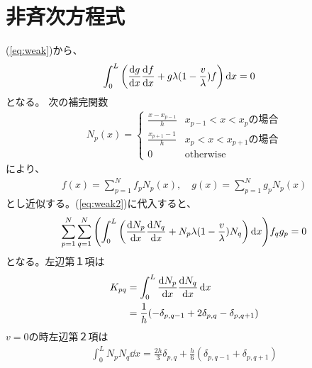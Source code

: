 \documentclass[xelatex,ja=standard]{bxjsarticle}
\begin{document}
\section{非斉次方程式}
(\ref{eq:weak})から、
\begin{align}
    \int_0^L\qty(\dv{g}{x}\dv{f}{x} + g\lambda(1 - \frac{v}{\lambda})f)\dd{x}
     &= 0 \label{eq:weak2}
\end{align}
となる。
次の補完関数
\begin{align}
    N_p(x) = 
    \begin{cases}
        \frac{x-x_{p-1}}{h}&x_{p-1}<x<x_pの場合\\
        \frac{x_{p+1} - 1}{h}&x_{p}<x<x_{p+1}の場合\\
        0&\text{otherwise}
    \end{cases}
\end{align}
により、
\begin{align}
    f(x) = \sum_{p=1}^N f_pN_p(x),\quad g(x) = \sum_{p=1}^N g_pN_p(x)
\end{align}
とし近似する。(\ref{eq:weak2})に代入すると、
\begin{align}
    \sum_{p=1}^N\sum_{q=1}^N\qty(\int_0^L\qty(\dv{N_p}{x}\dv{N_q}{x} + N_p\lambda(1 - \frac{v}{\lambda})N_q)\dd{x})f_qg_p = 0
\end{align}
となる。左辺第１項は
\begin{align}
    K_{pq} &= \int_0^L\dv{N_p}{x}\dv{N_q}{x}\dd{x}\notag\\
     &= \frac{1}{h}\qty(-\delta_{p,q-1} + 2\delta_{p,q} - \delta_{p,q+1})
\end{align}
$v=0$の時左辺第２項は
\begin{align}
    \int_0^L N_pN_q\dd{x} = \frac{2h}{3}\delta_{p,q} + \frac{h}{6}(\delta_{p,q-1} + \delta_{p,q+1})
\end{align}
\end{document}
